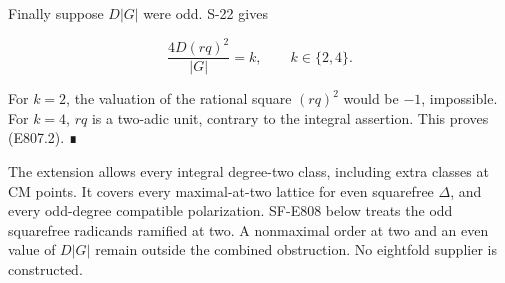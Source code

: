 Finally suppose \(D|G|\) were odd. S-22 gives

\[
 \frac{4D(rq)^2}{|G|}=k,\qquad k\in\{2,4\}.
\]

For \(k=2\), the valuation of the rational square \((rq)^2\) would be
\(-1\), impossible. For \(k=4\), \(rq\) is a two-adic unit, contrary to
the integral assertion. This proves (E807.2). ∎

The extension allows every integral degree-two class, including extra
classes at CM points. It covers every maximal-at-two lattice for even
squarefree \(\Delta\), and every odd-degree compatible polarization.
SF-E808 below treats the odd squarefree radicands ramified at two. A
nonmaximal order at two and an even value of \(D|G|\) remain outside the
combined obstruction. No eightfold supplier is constructed.

